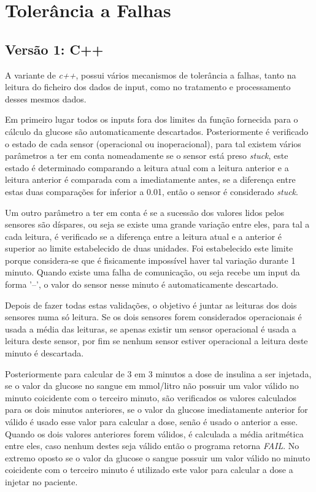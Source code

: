 \chapter{Tolerância a Falhas}
\label{cha:tolerancia_a_falhas}

\section{Versão 1: C++}
\label{sec:versao1_cpp}
A variante de \textit{c++}, possui vários mecanismos de tolerância a falhas, tanto na leitura do ficheiro dos dados
de input, como no tratamento e processamento desses mesmos dados.\par
Em primeiro lugar todos os inputs fora dos limites da função fornecida para o cálculo da glucose são automaticamente
descartados. Posteriormente é verificado o estado de cada sensor (operacional ou inoperacional), para tal existem
vários parâmetros a ter em conta nomeadamente se o sensor está preso \textit{stuck}, este estado é determinado 
comparando a leitura atual com a leitura anterior e a leitura anterior é comparada com a imediatamente antes, se a diferença entre
estas duas comparações for inferior a 0.01, então o sensor é considerado \textit{stuck}. \par Um outro parâmetro a ter
em conta é se a sucessão dos valores lidos pelos sensores são díspares, ou seja se existe uma grande variação entre
eles, para tal a cada leitura, é verificado se a diferença entre a leitura atual e a anterior é superior ao limite
estabelecido de duas unidades. Foi estabelecido este limite porque considera-se que é fisicamente impossível haver
tal variação durante 1 minuto. Quando existe uma falha de comunicação, ou seja recebe um input da forma '--', o valor
do sensor nesse minuto é automaticamente descartado.\par Depois de fazer todas estas validações, o objetivo é juntar as
leituras dos dois sensores numa só leitura. Se os dois sensores forem considerados operacionais é usada a média das
leituras, se apenas existir um sensor operacional é usada a leitura deste sensor, por fim se nenhum sensor estiver
operacional a leitura deste minuto é descartada.\par Posteriormente para calcular de 3 em 3 minutos a dose de insulina
a ser injetada, se o valor da glucose no sangue em mmol/litro não possuir um valor válido no minuto coicidente com o
terceiro minuto, são verificados os valores calculados para os dois minutos anteriores, se o valor da glucose
imediatamente anterior for válido é usado esse valor para calcular a dose, senão é usado o anterior a esse. Quando os
dois valores anteriores forem válidos, é calculada a média aritmética entre eles, caso nenhum destes seja válido então
o programa retorna \textit{FAIL}. No extremo oposto se o valor da glucose o sangue possuir um valor válido no minuto
coicidente com o terceiro minuto é utilizado este valor para calcular a dose a injetar no paciente.

